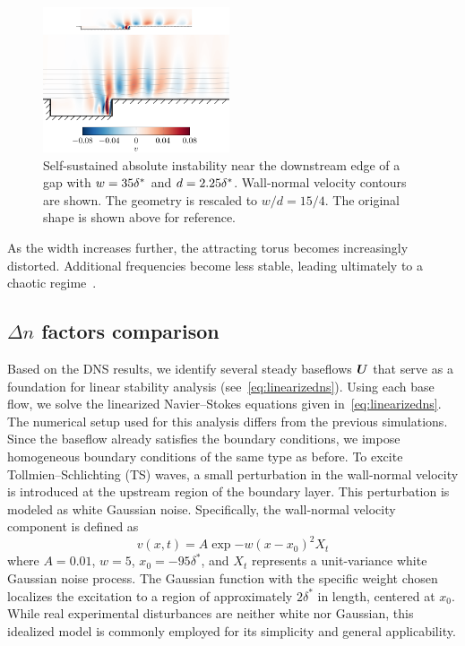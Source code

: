 \documentclass[../main.tex]{subfiles}
\begin{document}
\begin{figure}[H]
	\centering
	\includegraphics[width=0.49\textwidth]{../../Images/gapd2.25_w35.pdf}
	\caption{Self-sustained absolute instability near the downstream edge of a gap with $w=35{\delta^*}$ and $d=2.25{\delta^*}$. Wall-normal velocity contours are shown. The geometry is rescaled to $w/d=15/4$. The original shape is shown above for reference.}
	\label{fig:absoluteInstability}
\end{figure}

As the width increases further, the attracting torus becomes increasingly distorted. Additional frequencies become less stable, leading ultimately to a chaotic regime~\cite{natureTurbulence}.

\subsection{\texorpdfstring{$\Delta n$}{dn} factors comparison}
\label{sec:results:comparison}

Based on the DNS results, we identify several steady baseflows $\bm{U}$ that serve as a foundation for linear stability analysis (see~\cref{eq:linearizedns}). Using each base flow, we solve the linearized Navier--Stokes equations given in~\cref{eq:linearizedns}. The numerical setup used for this analysis differs from the previous simulations. Since the baseflow already satisfies the boundary conditions, we impose homogeneous boundary conditions of the same type as before. To excite Tollmien--Schlichting (TS) waves, a small perturbation in the wall-normal velocity is introduced at the upstream region of the boundary layer. This perturbation is modeled as white Gaussian noise. Specifically, the wall-normal velocity component is defined as  
\begin{equation}
v(x,t) = A \exp{-w(x-x_0)^2} X_t
\end{equation}
where $A = 0.01$, $w = 5$, $x_0 = -95\delta^*$, and $X_t$ represents a unit-variance white Gaussian noise process. The Gaussian function with the specific weight chosen localizes the excitation to a region of approximately $2\delta^*$ in length, centered at $x_0$. While real experimental disturbances are neither white nor Gaussian, this idealized model is commonly employed for its simplicity and general applicability.
\end{document}

